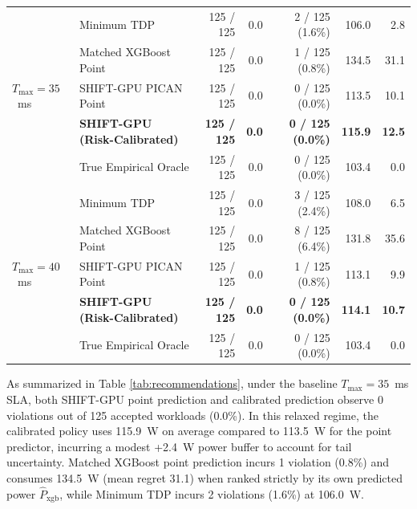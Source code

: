 \documentclass[preprint,12pt]{elsarticle}
\begin{document}
\begin{table}[h]
{\begin{tabular}{llrrrrr}
\midrule
\multirow{5}{*}{$T_{\max} = 35$~ms} 
& Minimum TDP & 125 / 125 & 0.0 & 2 / 125 (1.6\%) & 106.0 & 2.8 \\
& Matched XGBoost Point & 125 / 125 & 0.0 & 1 / 125 (0.8\%) & 134.5 & 31.1 \\
& SHIFT-GPU PICAN Point & 125 / 125 & 0.0 & 0 / 125 (0.0\%) & 113.5 & 10.1 \\
& \textbf{SHIFT-GPU (Risk-Calibrated)} & \textbf{125 / 125} & \textbf{0.0} & \textbf{0 / 125 (0.0\%)} & \textbf{115.9} & \textbf{12.5} \\
& True Empirical Oracle & 125 / 125 & 0.0 & 0 / 125 (0.0\%) & 103.4 & 0.0 \\
\midrule
\multirow{5}{*}{$T_{\max} = 40$~ms} 
& Minimum TDP & 125 / 125 & 0.0 & 3 / 125 (2.4\%) & 108.0 & 6.5 \\
& Matched XGBoost Point & 125 / 125 & 0.0 & 8 / 125 (6.4\%) & 131.8 & 35.6 \\
& SHIFT-GPU PICAN Point & 125 / 125 & 0.0 & 1 / 125 (0.8\%) & 113.1 & 9.9 \\
& \textbf{SHIFT-GPU (Risk-Calibrated)} & \textbf{125 / 125} & \textbf{0.0} & \textbf{0 / 125 (0.0\%)} & \textbf{114.1} & \textbf{10.7} \\
& True Empirical Oracle & 125 / 125 & 0.0 & 0 / 125 (0.0\%) & 103.4 & 0.0 \\
\bottomrule
\end{tabular}%
}
\end{table}

As summarized in Table \ref{tab:recommendations}, under the baseline $T_{\max} = 35$~ms SLA, both SHIFT-GPU point prediction and calibrated prediction observe 0 violations out of 125 accepted workloads (0.0\%). In this relaxed regime, the calibrated policy uses 115.9~W on average compared to 113.5~W for the point predictor, incurring a modest +2.4~W power buffer to account for tail uncertainty. Matched XGBoost point prediction incurs 1 violation (0.8\%) and consumes 134.5~W (mean regret 31.1) when ranked strictly by its own predicted power $\hat{P}_{\text{xgb}}$, while Minimum TDP incurs 2 violations (1.6\%) at 106.0~W.
\end{document}
